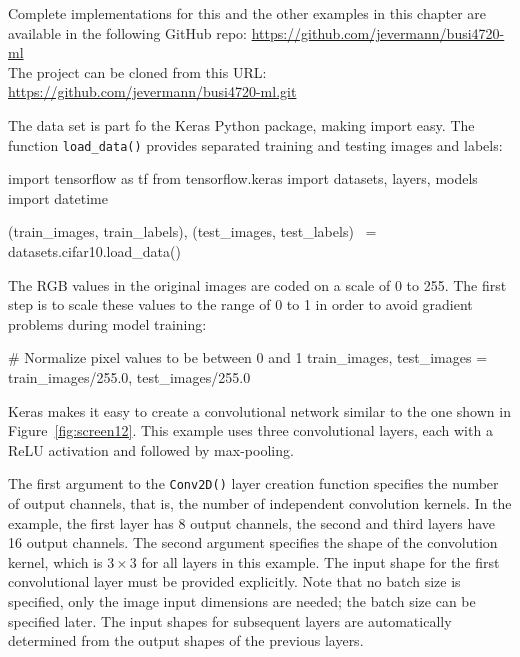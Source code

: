 \begin{tcolorbox}[colback=code]
\footnotesize
Complete implementations for this and the other examples in this chapter are available in the following GitHub repo:
\url{https://github.com/jevermann/busi4720-ml} \\

The project can be cloned from this URL: \url{https://github.com/jevermann/busi4720-ml.git}
\normalsize
\end{tcolorbox}

The data set is part fo the Keras Python package, making import easy. The function \texttt{load\_data()} provides separated training and testing images and labels:

\begin{samepage}
\begin{pythoncode}
import tensorflow as tf
from tensorflow.keras import datasets, layers, models
import datetime

(train_images, train_labels), (test_images, test_labels) \
    = datasets.cifar10.load_data()
\end{pythoncode}
\end{samepage}

The RGB values in the original images are coded on a scale of 0 to 255. The first step is to scale these values to the range of 0 to 1 in order to avoid gradient problems during model training:

\begin{samepage}
\begin{pythoncode}
# Normalize pixel values to be between 0 and 1
train_images, test_images = train_images/255.0, test_images/255.0
\end{pythoncode}
\end{samepage}

Keras makes it easy to create a convolutional network similar to the one shown in Figure~\ref{fig:screen12}. This example uses three convolutional layers, each with a ReLU activation and followed by max-pooling. 

The first argument to the \texttt{Conv2D()} layer creation function specifies the number of output channels, that is, the number of independent convolution kernels. In the example, the first layer has 8 output channels, the second and third layers have 16 output channels. The second argument specifies the shape of the convolution kernel, which is $3 \times 3$ for all layers in this example. The input shape for the first convolutional layer must be provided explicitly. Note that no batch size is specified, only the image input dimensions are needed; the batch size can be specified later. The input shapes for subsequent layers are automatically determined from the output shapes of the previous layers.

